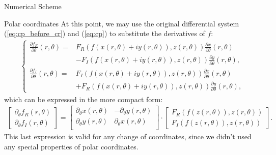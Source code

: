 \begin{section}{Numerical Scheme}
\begin{subsection}{Polar coordinates}
      At this point, we may use the original differential system
      (\ref{eq:cp_before_cr}) and (\ref{eq:cp}) to substitute the
      derivatives of $f$:
      \begin{align}
\left\{
        \begin{aligned}
          \frac{\partial f_{R}}{\partial \theta}(r,\theta) =& F_{R}(f(x(r,\theta)+iy(r,\theta)),z(r,\theta))\frac{\partial x}{\partial \theta}(r,\theta) \\
          &-F_{I}(f(x(r,\theta)+iy(r,\theta)),z(r,\theta))\frac{\partial y}{\partial \theta}(r,\theta),\\
          \frac{\partial f_{I}}{\partial \theta}(r,\theta) =& F_{I}(f(x(r,\theta)+iy(r,\theta)),z(r,\theta))\frac{\partial x}{\partial \theta}(r,\theta) \\
          &+ F_{R}(f(x(r,\theta)+iy(r,\theta)),z(r,\theta))\frac{\partial y}{\partial \theta}(r,\theta),
        \end{aligned}
        \right.
      \end{align}
      which can be expressed in the more compact form:
      \begin{align}
        \begin{bmatrix}
          \partial_\theta f_{R}(r,\theta)\\
          \partial_\theta f_{I}(r,\theta)
        \end{bmatrix}
        =
        \begin{bmatrix}
          \partial_\theta x(r,\theta) & -\partial_\theta y(r,\theta)\\
          \partial_\theta y(r,\theta) & \partial_\theta x(r,\theta)\\
        \end{bmatrix}\cdot
        \begin{bmatrix}
          F_{R}(f(z(r,\theta)), z(r,\theta))\\
          F_{I}(f(z(r,\theta)), z(r,\theta))
        \end{bmatrix}.
      \end{align}
      This last expression is valid for any change of coordinates,
      since we didn't used any special properties of polar
      coordinates.


\end{subsection}
\end{section}
